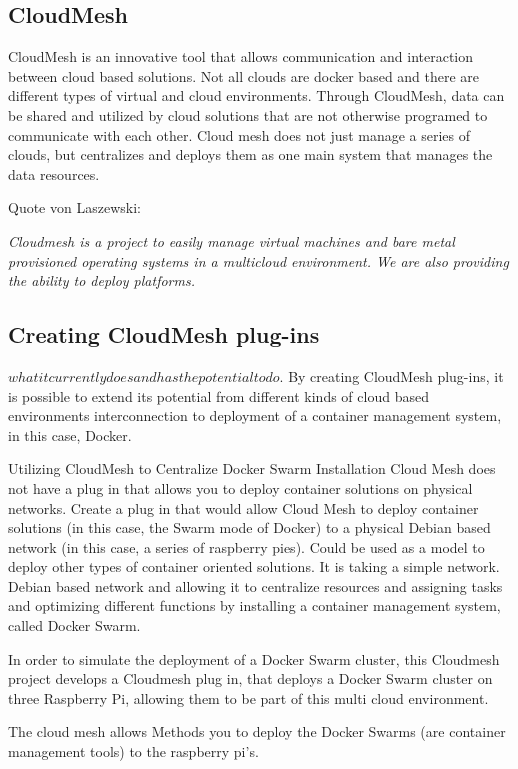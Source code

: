 \subsection{CloudMesh}

CloudMesh is an innovative tool that allows communication and
interaction between cloud based solutions. Not all clouds are docker
based and there are different types of virtual and cloud
environments. Through CloudMesh, data can be shared and utilized by
cloud solutions that are not otherwise programed to communicate with
each other.  Cloud mesh does not just manage a series of clouds, but
centralizes and deploys them as one main system that manages the data
resources.
	
Quote von Laszewski:

\emph{Cloudmesh is a project to easily manage virtual machines and
  bare metal provisioned operating systems in a multicloud
  environment.  We are also providing the ability to deploy
  platforms.}
	
\subsection{Creating CloudMesh plug-ins}

$what it currently does and has the potential to do$.  By creating
CloudMesh plug-ins, it is possible to extend its potential from
different kinds of cloud based environments interconnection to
deployment of a container management system, in this case, Docker.
	
Utilizing CloudMesh to Centralize Docker Swarm Installation Cloud Mesh
does not have a plug in that allows you to deploy container solutions
on physical networks.  Create a plug in that would allow Cloud Mesh to
deploy container solutions (in this case, the Swarm mode of Docker) to
a physical Debian based network (in this case, a series of raspberry
pies).  Could be used as a model to deploy other types of container
oriented solutions.  It is taking a simple network. Debian based
network and allowing it to centralize resources and assigning tasks
and optimizing different functions by installing a container
management system, called Docker Swarm.
	
In order to simulate the deployment of a Docker Swarm cluster, this
Cloudmesh project develops a Cloudmesh plug in, that deploys a Docker
Swarm cluster on three Raspberry Pi, allowing them to be part of this
multi cloud environment.
	
The cloud mesh allows Methods you to deploy the Docker Swarms (are
container management tools) to the raspberry pi's.
	
